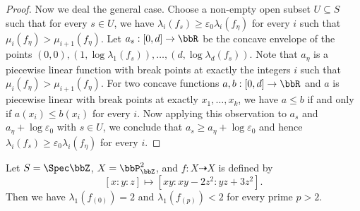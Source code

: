 \begin{proof}
	Now we deal the general case.
	Choose a non-empty open subset $U \subseteq S$ such that for every $s \in U$, we have $\lambda_i(f_s) \geq \varepsilon_0 \lambda_i(f_\eta)$ for every $i$ such that $\mu_i(f_\eta) > \mu_{i+1}(f_\eta)$.
	Let $a_s: [0,d] \to \bbR$ be the concave envelope of the points $(0,0), (1, \log \lambda_1(f_s)), \ldots, (d, \log \lambda_d(f_s))$.
	Note that $a_\eta$ is a piecewise linear function with break points at exactly the integers $i$ such that $\mu_i(f_\eta) > \mu_{i+1}(f_\eta)$.
	For two concave functions $a, b: [0,d] \to \bbR$ and $a$ is piecewise linear with break points at exactly $x_1, \ldots, x_k$, we have $a \leq b$ if and only if $a(x_i) \leq b(x_i)$ for every $i$.
	Now applying this observation to $a_s$ and $a_\eta + \log \varepsilon_0$ with $s \in U$, we conclude that $a_s \geq a_\eta + \log \varepsilon_0$ and hence $\lambda_i(f_s) \geq \varepsilon_0 \lambda_i(f_\eta)$ for every $i$.
\end{proof}

\begin{example}
	Let $S = \Spec \bbZ$, $X = \bbP^2_{\bbZ}$, and $f: X \dashrightarrow X$ is defined by
	\[ [x:y:z] \mapsto [xy:xy-2z^2:yz+3z^2]. \]
	Then we have $\lambda_1(f_{(0)}) = 2$ and $\lambda_1(f_{(p)}) < 2$ for every prime $p > 2$.

\end{example}
